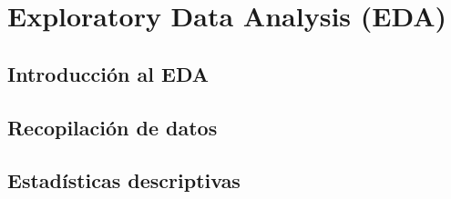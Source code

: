 \documentclass[letterpaper, 12pt]{report}
\begin{document}
\chapter{Exploratory Data Analysis (EDA)}



\section{Introducción al EDA}


\section{Recopilación de datos}


\section{Estadísticas descriptivas}


% 

%

%

%

\begin{doublespace}
  
  
\end{doublespace}
\end{document}
